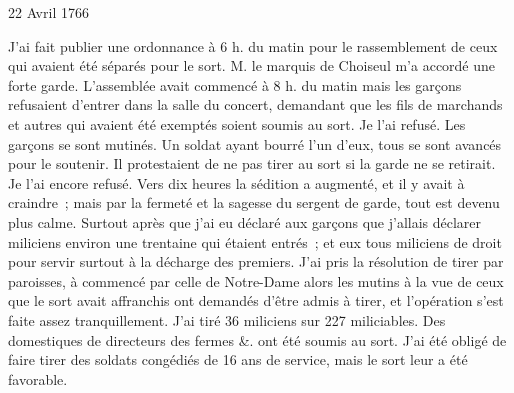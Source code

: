                      \begin{diary}{22 Avril 1766}{}
                        
                         J'ai fait publier une ordonnance à 6 h. du matin
                           pour le rassemblement de ceux qui avaient
                           été séparés pour le sort. M. le marquis de Choiseul
                           m'a accordé une forte garde. L'assemblée
                           avait commencé à 8 h. du matin mais les
                           garçons refusaient d'entrer dans la salle
                           du concert, demandant que les fils de marchands
                           et autres qui avaient été exemptés soient
                           soumis au sort. Je l'ai refusé. Les garçons
                           se sont mutinés. Un soldat ayant bourré l'un d'eux, tous se
                           sont avancés pour le soutenir.
                           Il protestaient de ne pas tirer au sort si la
                           garde ne se retirait. Je l'ai encore refusé.
                           Vers dix heures la sédition a augmenté, et
                           il y avait à craindre ; mais par la fermeté
                           et la sagesse du sergent de garde, tout est
                           devenu plus calme. Surtout après que
                           j'ai eu déclaré aux garçons que j'allais
                           déclarer miliciens environ une trentaine
                           qui étaient entrés ; et eux tous miliciens
                           de droit pour servir surtout à la décharge
                           des premiers. J'ai pris la résolution de
                           tirer par paroisses, à commencé par
                           celle de Notre-Dame alors les mutins à la vue
                           de ceux que le sort avait affranchis ont
                           demandés d'être admis à tirer, et l'opération
                           s'est faite assez
                           tranquillement. J'ai tiré
                           36 miliciens sur 227 miliciables.
                           Des domestiques de directeurs des fermes
                           &. ont été soumis au sort. J'ai été
                           obligé de faire tirer des soldats congédiés
                           de 16 ans de service, mais le sort leur
                           a été favorable. \bigskip
        
        
                     \end{diary}

